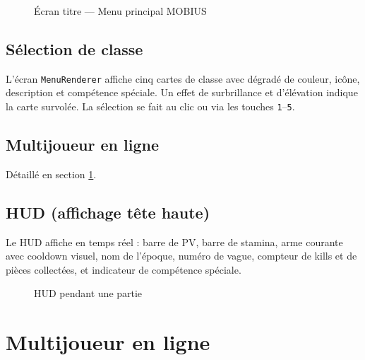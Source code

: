 \documentclass[12pt, a4paper]{report}
\begin{document}
\begin{figure}[H]
  \centering
  \caption{\'{E}cran titre --- Menu principal MOBIUS}
\end{figure}

\subsection{S\'{e}lection de classe}

L'\'{e}cran \texttt{MenuRenderer} affiche cinq cartes de classe avec d\'{e}grad\'{e} de couleur, ic\^{o}ne, description et comp\'{e}tence sp\'{e}ciale. Un effet de surbrillance et d'\'{e}l\'{e}vation indique la carte survol\'{e}e. La s\'{e}lection se fait au clic ou via les touches \texttt{1}--\texttt{5}.

\subsection{Multijoueur en ligne}

D\'{e}taill\'{e} en section \ref{sec:multi}.

\subsection{HUD (affichage t\^{e}te haute)}

Le HUD affiche en temps r\'{e}el : barre de PV, barre de stamina, arme courante avec cooldown visuel, nom de l'\'{e}poque, num\'{e}ro de vague, compteur de kills et de pi\`{e}ces collect\'{e}es, et indicateur de comp\'{e}tence sp\'{e}ciale.

\begin{figure}[H]
  \centering
  \caption{HUD pendant une partie}
\end{figure}

\section{Multijoueur en ligne}
\label{sec:multi}
\end{document}
